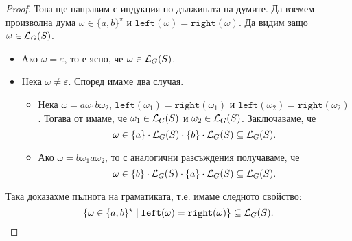 \begin{proof}
  Това ще направим с индукция по дължината на думите.
  Да вземем произволна дума $\omega \in \{a,b\}^\star$ и $\texttt{left}(\omega) = \texttt{right}(\omega)$.
  Да видим защо $\omega \in \mathcal{L}_G(S)$.
  \begin{itemize}
  \item 
    Ако $\omega = \varepsilon$, то е ясно, че $\omega \in \mathcal{L}_G(S)$.
  \item
    Нека $\omega \neq \varepsilon$. Според  имаме два случая.
    \begin{itemize}
    \item
      Нека $\omega = a \omega_1 b \omega_2$, $\texttt{left}(\omega_1) = \texttt{right}(\omega_1)$ и $\texttt{left}(\omega_2) = \texttt{right}(\omega_2)$.
      Тогава от \IndHyp имаме, че $\omega_1 \in \mathcal{L}_G(S)$ и $\omega_2 \in \mathcal{L}_G(S)$. Заключаваме, че
      \[\omega \in \{a\} \cdot \mathcal{L}_G(S) \cdot \{b\} \cdot \mathcal{L}_G(S) \subseteq \mathcal{L}_G(S).\]
    \item
      Ако $\omega = b \omega_1 a \omega_2$, то с аналогични разсъждения получаваме, че
      \[\omega \in \{b\} \cdot \mathcal{L}_G(S) \cdot \{a\} \cdot \mathcal{L}_G(S) \subseteq \mathcal{L}_G(S).\]
    \end{itemize}
  \end{itemize}
  Така доказахме пълнота на граматиката, т.е. имаме следното свойство:
  \[\{\omega \in \{a,b\}^\star \mid \texttt{left}(\omega) = \texttt{right}(\omega)\} \subseteq \mathcal{L}_G(S).\]
\end{proof}


